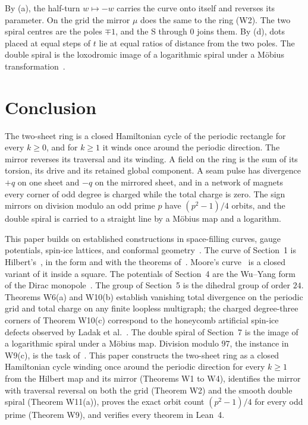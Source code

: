 \documentclass[11pt,a4paper]{article}
\theoremstyle{definition}
\begin{document}
By (a), the half-turn $w\mapsto-w$ carries the curve onto itself and reverses its parameter. On the grid the mirror $\mu$ does the same to the ring (W2). The two spiral centres are the poles $\mp1$, and the S through $0$ joins them. By (d), dots placed at equal steps of $t$ lie at equal ratios of distance from the two poles. The double spiral is the loxodromic image of a logarithmic spiral under a Möbius transformation~\cite{needham}.

\section{Conclusion}
The two-sheet ring is a closed Hamiltonian cycle of the periodic rectangle for every $k\ge0$, and for $k\ge1$ it winds once around the periodic direction. The mirror reverses its traversal and its winding. A field on the ring is the sum of its torsion, its drive and its retained global component. A seam pulse has divergence $+q$ on one sheet and $-q$ on the mirrored sheet, and in a network of magnets every corner of odd degree is charged while the total charge is zero. The sign mirrors on division modulo an odd prime $p$ have $(p^2-1)/4$ orbits, and the double spiral is carried to a straight line by a Möbius map and a logarithm.

This paper builds on established constructions in space-filling curves, gauge potentials, spin-ice lattices, and conformal geometry~\cite{hilbert,moore,wuyang,ladak,ufo,unifier,needham}. The curve of Section~1 is Hilbert's~\cite{hilbert}, in the form and with the theorems of~\cite{unifier}. Moore's curve~\cite{moore} is a closed variant of it inside a square. The potentials of Section~4 are the Wu--Yang form of the Dirac monopole~\cite{wuyang}. The group of Section~5 is the dihedral group of order $24$. Theorems W6(a) and W10(b) establish vanishing total divergence on the periodic grid and total charge on any finite loopless multigraph; the charged degree-three corners of Theorem W10(c) correspond to the honeycomb artificial spin-ice defects observed by Ladak et al.~\cite{ladak}. The double spiral of Section~7 is the image of a logarithmic spiral under a Möbius map. Division modulo $97$, the instance in W9(c), is the task of~\cite{ufo}. This paper constructs the two-sheet ring as a closed Hamiltonian cycle winding once around the periodic direction for every $k\ge1$ from the Hilbert map and its mirror (Theorems W1 to W4), identifies the mirror with traversal reversal on both the grid (Theorem W2) and the smooth double spiral (Theorem W11(a)), proves the exact orbit count $(p^2-1)/4$ for every odd prime (Theorem W9), and verifies every theorem in Lean~4.
\end{document}
